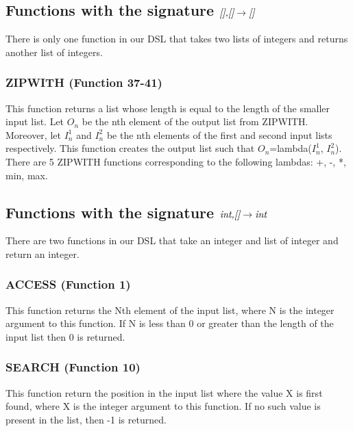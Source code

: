 \subsection{Functions with the signature $\emph{[],[]} \rightarrow \emph{[]}$}
There is only one function in our DSL that takes two lists of integers and returns another list of integers.
\subsubsection{ZIPWITH (Function 37-41)}
This function returns a list whose length is equal to the length of the smaller input list.  Let $O_n$ be the nth element of the output list from ZIPWITH.  Moreover, let $I^1_n$ and $I^2_n$ be the nth elements of the first and second input lists respectively.  This function creates the output list such that $O_n$=lambda($I^1_n$, $I^2_n$).  There are 5 ZIPWITH functions corresponding to the following lambdas: +, -, *, min, max.

\subsection{Functions with the signature $\emph{int,[]} \rightarrow \emph{int}$}
There are two functions in our DSL that take an integer and list of integer and return an integer.
\subsubsection{ACCESS (Function 1)}
This function returns the Nth element of the input list, where N is the integer argument to this function.  If N is less than 0 or greater than the length of the input list then 0 is returned.
\subsubsection{SEARCH (Function 10)}
This function return the position in the input list where the value X is first found, where X is the integer argument to this function.  If no such value is present in the list, then -1 is returned.